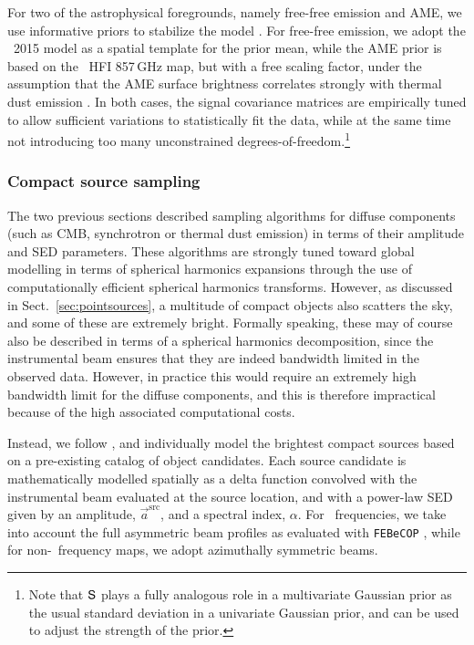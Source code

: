 \documentclass[twocolumn]{aa}
\renewcommand{\a}[0]{\vec{a}}
\renewcommand{\S}[0]{\tens{S}}
\begin{document}
For two of the astrophysical foregrounds, namely free-free emission
and AME, we use informative priors to stabilize the model
\citep{bp13}. For free-free emission, we adopt the \Planck\ 2015 model
\citep{planck2014-a12} as a spatial template for the prior mean, while
the AME prior is based on the \Planck\ HFI 857\,GHz map, but with a
free scaling factor, under the assumption that the AME surface
brightness correlates strongly with thermal dust emission
\citep{planck2014-a12}. In both cases, the signal covariance matrices
are empirically tuned to allow sufficient variations to statistically
fit the data, while at the same time not introducing too many
unconstrained degrees-of-freedom.\footnote{Note that $\S$ plays a
  fully analogous role in a multivariate Gaussian prior as the usual
  standard deviation in a univariate Gaussian prior, and can be used
  to adjust the strength of the prior.}

\subsubsection{Compact source sampling}
\label{sec:ptsrc}  

The two previous sections described sampling algorithms for diffuse
components (such as CMB, synchrotron or thermal dust emission) in
terms of their amplitude and SED parameters. These algorithms are
strongly tuned toward global modelling in terms of spherical harmonics
expansions through the use of computationally efficient spherical
harmonics transforms. However, as discussed in
Sect.~\ref{sec:pointsources}, a multitude of compact objects also
scatters the sky, and some of these are extremely bright. Formally
speaking, these may of course also be described in terms of a
spherical harmonics decomposition, since the instrumental beam ensures
that they are indeed bandwidth limited in the observed data. However,
in practice this would require an extremely high bandwidth limit for the
diffuse components, and this is therefore impractical because of the
high associated computational costs.

Instead, we follow \citet{planck2016-l04}, and individually model the
brightest compact sources based on a pre-existing catalog of object
candidates. Each source candidate is mathematically modelled spatially
as a delta function convolved with the instrumental beam evaluated at
the source location, and with a power-law SED given by an amplitude,
$\a^{\mathrm{src}}$, and a spectral index, $\alpha$. For
\Planck\ frequencies, we take into account the full asymmetric beam
profiles as evaluated with \texttt{FEBeCOP} \citep{mitra2010}, while for
non-\Planck\ frequency maps, we adopt azimuthally symmetric beams.
\end{document}
